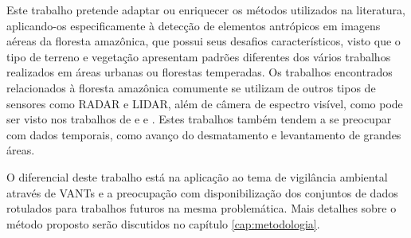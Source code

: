 Este trabalho pretende adaptar ou enriquecer os métodos utilizados na literatura, aplicando-os especificamente à detecção de elementos antrópicos em imagens aéreas da floresta amazônica, que possui seus desafios característicos, visto que o tipo de terreno e vegetação apresentam padrões diferentes dos vários trabalhos realizados em áreas urbanas ou florestas temperadas. Os trabalhos encontrados relacionados à floresta amazônica comumente se utilizam de outros tipos de sensores como RADAR e LIDAR, além de câmera de espectro visível, como pode ser visto nos trabalhos de  e  e . Estes trabalhos também tendem a se preocupar com dados temporais, como avanço do desmatamento e levantamento de grandes áreas.

O diferencial deste trabalho está na aplicação ao tema de vigilância ambiental através de VANTs e a preocupação com disponibilização dos conjuntos de dados rotulados para trabalhos futuros na mesma problemática. Mais detalhes sobre o método proposto serão discutidos no capítulo \ref{cap:metodologia}.